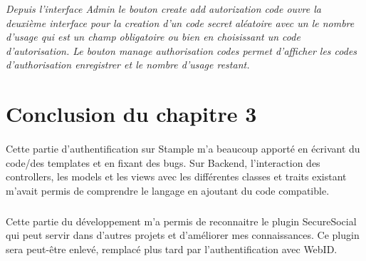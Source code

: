 \textit{Depuis l'interface Admin le bouton create add autorization code ouvre la deuxième interface pour la creation d'un code secret aléatoire avec un le nombre d'usage qui est un champ obligatoire ou bien en choisissant un code d'autorisation.
Le bouton manage authorisation codes permet d'afficher les codes d'authorisation enregistrer et le nombre d'usage restant.
}
\section{Conclusion du chapitre 3}
\paragraph{}
Cette partie d'authentification sur Stample m'a beaucoup apporté en écrivant du code/des templates et en fixant des bugs.
Sur Backend, l'interaction des controllers, les models et les views avec les différentes classes et traits existant m'avait permis de comprendre le langage en ajoutant du code compatible.
\subparagraph{}
Cette partie du développement m'a permis de reconnaitre le plugin SecureSocial qui peut servir dans d'autres projets et d'améliorer mes connaissances. 
Ce plugin sera peut-être enlevé, remplacé plus tard par l'authentification avec WebID. 
